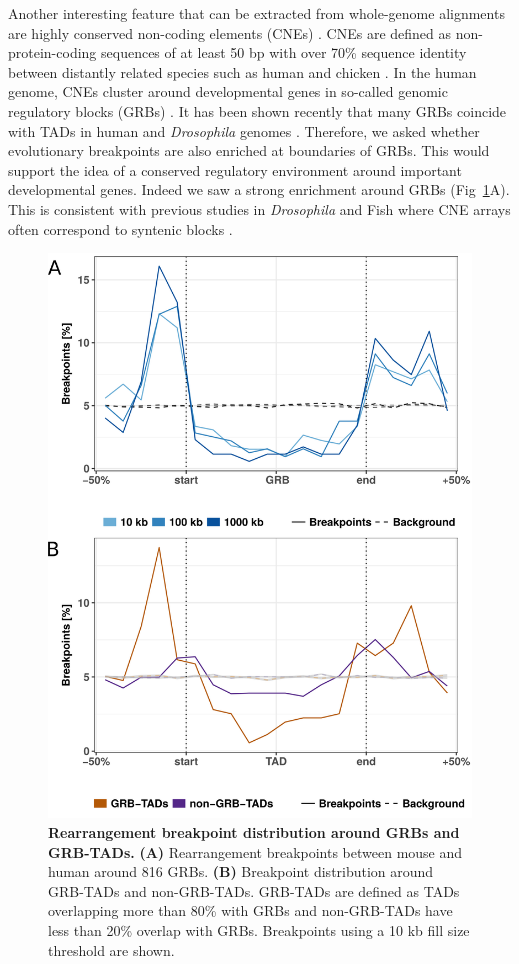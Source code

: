 \documentclass[a4paper,twoside=true,openright,parskip=full,chapterprefix=true,11pt,headings=normal,bibliography=totoc,listof=totoc,titlepage=on,captions=tableabove,draft=false]{scrreprt}
\theoremstyle{definition}
\theoremstyle{definition}
\theoremstyle{definition}
\theoremstyle{remark}
\begin{document}
Another interesting feature that can be extracted from whole-genome
alignments are highly conserved non-coding elements (CNEs)
\citep{Polychronopoulos2017}. CNEs are defined as non-protein-coding
sequences of at least 50 bp with over 70\% sequence identity between
distantly related species such as human and chicken
\citep{Polychronopoulos2017}. In the human genome, CNEs cluster around
developmental genes in so-called genomic regulatory blocks (GRBs)
\citep{Kikuta2007}. It has been shown recently that many GRBs coincide
with TADs in human and \emph{Drosophila} genomes \citep{Harmston2017}.
Therefore, we asked whether evolutionary breakpoints are also enriched
at boundaries of GRBs. This would support the idea of a conserved
regulatory environment around important developmental genes. Indeed we
saw a strong enrichment around GRBs (Fig~\ref{fig:TadEvo3}A). This is
consistent with previous studies in \emph{Drosophila} and Fish where CNE
arrays often correspond to syntenic blocks
\citep{Engstrom2007, Dimitrieva2013}.

\begin{figure}

{\centering \includegraphics[width=0.5\linewidth]{figures/TAD_evolution/fig3_v02} 

}

\caption{\textbf{Rearrangement breakpoint distribution around GRBs
and GRB-TADs. } \textbf{(A)} Rearrangement breakpoints between mouse and
human around 816 GRBs. \textbf{(B)} Breakpoint distribution around
GRB-TADs and non-GRB-TADs. GRB-TADs are defined as TADs overlapping more
than 80\% with GRBs and non-GRB-TADs have less than 20\% overlap with
GRBs. Breakpoints using a 10 kb fill size threshold are shown.}\label{fig:TadEvo3}
\end{figure}
\end{document}
